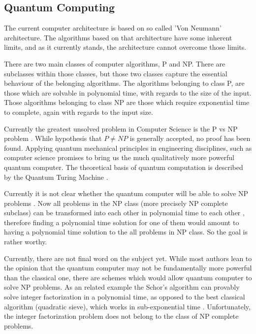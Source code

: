 \subsection*{Quantum Computing}

The current computer architecture is based on so called 'Von Neumann' architecture. The algorithms based on that architecture have some inherent limits, and as it currently stands, the architecture cannot overcome those limits.

There are two main  classes of computer algorithms, P and NP. There are subclasses within those classes, but those two classes capture the essential behaviour of the belonging algorithms. The algorithms belonging to class P, are those which are solvable in polynomial time, with regards to the size of the input. Those algorithms belonging to class NP are those which require exponential time to complete, again with regards to the input size.\cite{PvsNP}

Currently the greatest unsolved problem in Computer Science is the P vs NP problem \cite{PvsNP}. While hypothesis that $ P \neq NP $ is generally accepted, no proof has been found. Applying quantum mechanical principles in engineering disciplines, such as computer science \cite{FQC} promises to bring us the much qualitatively more powerful quantum computer. The theoretical basis of quantum computation is described by the Quantum Turing Machine \cite{QuantumTuring}.

Currently it is not clear whether the quantum computer will be able to solve NP problems \cite{QCvsNP}. Now all problems in the NP class (more precisely NP complete subclass) can be transformed into each other in polynomial time to each other \cite{NPComplete},  therefore finding a polynomial time solution for one of them would amount to having a polynomial time solution to the all problems in NP class. So the goal is rather worthy.

Currently, there are not final word on the subject yet. While most authors lean to the opinion that the quantum computer may not be fundamentally more powerful than the classical one, there are schemes \cite{NLQC} which would allow quantum computer to solve NP problems. As an related example the Schor's algorithm \cite{Schor} can provably solve integer factorization in a polynomial time, as opposed to the best classical algorithm (quadratic sieve), which works in sub-exponential time \cite{Pomerance}. Unfortunately, the integer factorization problem does not belong to the class of NP complete problems. 


